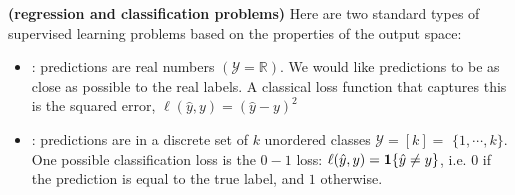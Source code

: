 \documentclass{article}
\newcommand{\bfs}[1]{\textbf{({#1}) }}
\begin{document}
\begin{exma}\bfs{regression and classification problems}
Here are two standard types of supervised learning problems based on the properties of the output space:
\begin{itemize}
    \item {}: predictions are real numbers $(\mathcal{Y}=\mathbb{R})$. We would like predictions to be as close as possible to the real labels. A classical loss function that captures this is the squared error, $\ell(\hat{y}, y)=(\hat{y}-y)^{2}$
    \item {}: predictions are in a discrete set of $k$ unordered classes $\mathcal{Y}=[k]=$ $\{1, \cdots, k\}$. One possible classification loss is the $0-1$ loss: $\ell(\hat{y}, y)=\indicate{\hat{y} \neq y}$, i.e. $0$ if the prediction is equal to the true label, and $1$ otherwise.
\end{itemize}
\end{exma}
\end{document}
